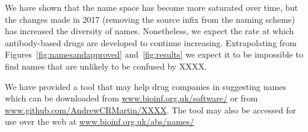 \documentclass{article}
\begin{document}
We have shown that the name space has become more saturated over time,
but the changes made in 2017 (removing the source infix from the
naming scheme) has increased the diversity of names. Nonetheless, we
expect the rate at which antibody-based drugs are developed to
continue increasing. Extrapolating from
Figures~\ref{fig:namesandapproved} and~\ref{fig:results} we expect it
to be impossible to find names that are unlikely to be confused by
XXXX.

We have provided a tool that may help drug companies in suggesting
names which can be downloaded from \url{www.bioinf.org.uk/software/}
or from \url{www.github.com/AndrewCRMartin/XXXX}. The tool may also be
accessed for use over the web at \url{www.bioinf.org.uk/abs/names/}



\end{document}
